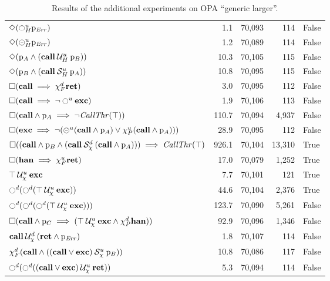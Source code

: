 \documentclass[9pt,a4paper]{article}
\begin{document}
\begin{table}[tb]
\begin{tabular}{| l | r | r | r | l |}
$\Diamond (\ocircle_H^{u} \mathrm{p}_\mathit{Err})$ 	&	1.1	&	70,093	&	114	&	False	\\
$\Diamond (\circleddash_H^{u} \mathrm{p}_\mathit{Err})$ 	&	1.2	&	70,089	&	114	&	False	\\
$\Diamond (\mathrm{p}_A \land ({\mathbf{call}} \mathbin{\mathcal{U}_H^u} {\mathrm{p}_B}))$ 	&	10.3	&	70,105	&	115	&	False	\\
$\Diamond (\mathrm{p}_B \land ({\mathbf{call}} \mathbin{\mathcal{S}_H^u} {\mathrm{p}_A}))$ 	&	10.8	&	70,095	&	115	&	False	\\
$\square (\mathbf{call} \implies \chi_F^{d} \mathbf{ret})$ 	&	3.0	&	70,095	&	112	&	False	\\
$\square (\mathbf{call} \implies \neg \ocircle^u \mathbf{exc})$ 	&	1.9	&	70,106	&	113	&	False	\\
$\square (\mathbf{call} \land \mathrm{p}_A \implies \neg \mathit{CallThr}(\top))$ 	&	110.7	&	70,094	&	4,937	&	False	\\
$\square (\mathbf{exc} \implies \neg (\circleddash^u (\mathbf{call} \land \mathrm{p}_A) \lor \chi_P^{u} (\mathbf{call} \land \mathrm{p}_A)))$ 	&	28.9	&	70,095	&	112	&	False	\\
$\square ((\mathbf{call} \land \mathrm{p}_B \land ({\mathbf{call}} \mathbin{\mathcal{S}_\chi^d} {(\mathbf{call} \land \mathrm{p}_A)})) \implies \mathit{CallThr}(\top)$ 	&	926.1	&	70,104	&	13,310	&	True	\\
$\square (\mathbf{han} \implies \chi_F^{u} \mathbf{ret})$ 	&	17.0	&	70,079	&	1,252	&	True	\\
${\top} \mathbin{\mathcal{U}_\chi^u} {\mathbf{exc}}$ 	&	7.7	&	70,101	&	121	&	True	\\
$\ocircle^d (\ocircle^d ({\top} \mathbin{\mathcal{U}_\chi^u} {\mathbf{exc}}))$ 	&	44.6	&	70,104	&	2,376	&	True	\\
$\ocircle^d (\ocircle^d (\ocircle^d ({\top} \mathbin{\mathcal{U}_\chi^u} {\mathbf{exc}})))$ 	&	123.7	&	70,090	&	5,261	&	False	\\
$\square (\mathbf{call} \land \mathrm{p}_C \implies ({\top} \mathbin{\mathcal{U}_\chi^u} {\mathbf{exc} \land \chi_P^{d} \mathbf{han}}))$ 	&	92.9	&	70,096	&	1,346	&	False	\\
${\mathbf{call}} \mathbin{\mathcal{U}_\chi^d} {(\mathbf{ret} \land \mathrm{p}_\mathit{Err})}$ 	&	1.8	&	70,107	&	114	&	False	\\
$\chi_F^{d} (\mathbf{call} \land ({(\mathbf{call} \lor \mathbf{exc})} \mathbin{\mathcal{S}_\chi^u} {\mathrm{p}_B}))$ 	&	10.8	&	70,086	&	117	&	False	\\
$\ocircle^d (\ocircle^d ({(\mathbf{call} \lor \mathbf{exc})} \mathbin{\mathcal{U}_\chi^u} {\mathbf{ret}}))$ 	&	5.3	&	70,094	&	114	&	False	\\
\hline
\end{tabular}
\caption{Results of the additional experiments on OPA ``generic larger''.}
\label{tab:more-exp-large}
\end{table}
\end{document}
